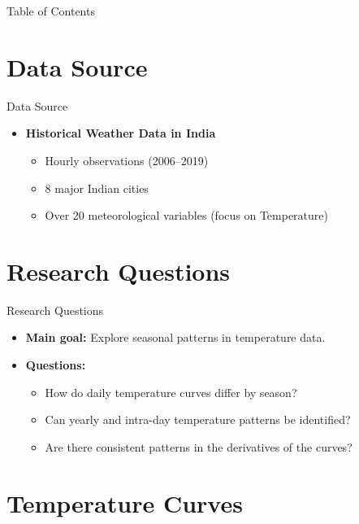 \documentclass[svgnames, 12pt]{beamer}
\begin{document}
\begin{frame}{Table of Contents}
\tableofcontents
\end{frame}

\section{Data Source}

\begin{frame}{Data Source}
			\begin{itemize}
		\item \textbf{Historical Weather Data in India}
		\begin{itemize}
			\item Hourly observations (2006--2019)
			\item 8 major Indian cities
			\item Over 20 meteorological variables (focus on Temperature)
		\end{itemize}
			\end{itemize}
\end{frame}

\section{Research Questions}

\begin{frame}{Research Questions}
	\begin{itemize}
		\item \textbf{Main goal:} Explore seasonal patterns in temperature data.
		\item \textbf{Questions:}
		\begin{itemize}
			\item How do daily temperature curves differ by season?
			\item Can yearly and intra-day temperature patterns be identified?
			\item Are there consistent patterns in the derivatives of the curves?
		\end{itemize}
	\end{itemize}
\end{frame}

\section{Temperature Curves}
\end{document}
